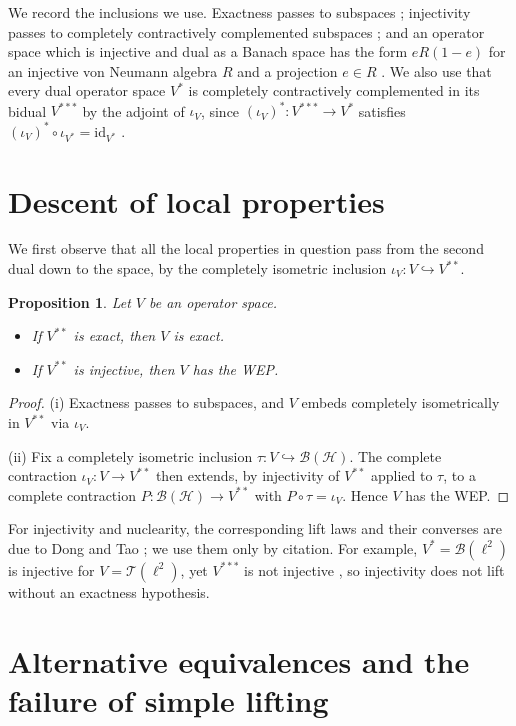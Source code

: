 \documentclass[12pt]{article}
\newtheorem{proposition}[theorem]{Proposition}
\theoremstyle{definition}
\theoremstyle{remark}
\newcommand{\B}{\mathcal{B}}
\newcommand{\T}{\mathcal{T}}
\newcommand{\Hil}{\mathcal{H}}
\newcommand{\ri}{\rightarrow}
\begin{document}
We record the inclusions we use. Exactness passes to subspaces
\cite[\S 17]{Pi03}; injectivity passes to completely contractively
complemented subspaces \cite[\S 6.1]{ER00}; and an operator space which is
injective and dual as a Banach space has the form $eR(1-e)$ for an injective
von Neumann algebra $R$ and a projection $e\in R$ \cite{EOR}. We also use that
every dual operator space $V^*$ is completely contractively complemented in
its bidual $V^{***}$ by the adjoint of $\iota_V$, since
$(\iota_V)^*:V^{***}\ri V^*$ satisfies $(\iota_V)^*\circ\iota_{V^*}
=\mathrm{id}_{V^*}$ \cite[\S 3.2]{ER00}.

\section{Descent of local properties}\label{sec:descent}

We first observe that all the local properties in question pass from the
second dual down to the space, by the completely isometric inclusion
$\iota_V:V\hookrightarrow V^{**}$.

\begin{proposition}\label{prop:descent}
Let $V$ be an operator space.
\begin{itemize}
\item[(i)] If $V^{**}$ is exact, then $V$ is exact.
\item[(ii)] If $V^{**}$ is injective, then $V$ has the WEP.
\end{itemize}
\end{proposition}

\begin{proof}
(i) Exactness passes to subspaces, and $V$ embeds completely isometrically in
$V^{**}$ via $\iota_V$.

(ii) Fix a completely isometric inclusion $\tau:V\hookrightarrow\B(\Hil)$. The
complete contraction $\iota_V:V\ri V^{**}$ then extends, by injectivity of
$V^{**}$ applied to $\tau$, to a complete contraction $P:\B(\Hil)\ri V^{**}$
with $P\circ\tau=\iota_V$. Hence $V$ has the WEP.
\end{proof}

For injectivity and nuclearity, the corresponding lift laws and their
converses are due to Dong and Tao \cite{DT}; we use them only by citation.
For example, $V^*=\B(\ell^2)$ is injective for $V=\T(\ell^2)$, yet
$V^{***}$ is not injective \cite[after Prop.~2.7]{DT}, so injectivity does
not lift without an exactness hypothesis.

\section{Alternative equivalences and the failure of simple lifting}
\label{sec:nolift}
\end{document}
